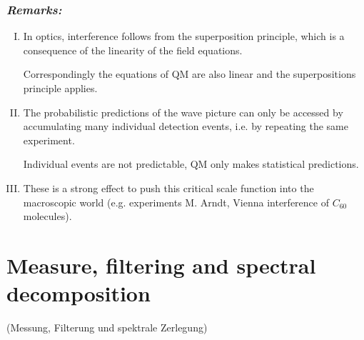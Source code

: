 \subsubsection*{\emph{Remarks:}}

\begin{enumerate}[I)]
	\item In optics, interference follows from the superposition principle, which is a consequence of the linearity of the field equations.\par
	Correspondingly the equations of QM are also linear and the superpositions principle applies.
	\item The probabilistic predictions of the wave picture can only be accessed by accumulating many individual detection events, i.e. by repeating the same experiment.\par
	Individual events are not predictable, QM only makes statistical predictions.
	\item These is a strong effect to push this critical scale function into the macroscopic world (e.g. experiments M. Arndt, Vienna interference of $ C_{60} $ molecules).
\end{enumerate}

\section{Measure, filtering and spectral decomposition}
\label{Isection2}

(Messung, Filterung und spektrale Zerlegung)

